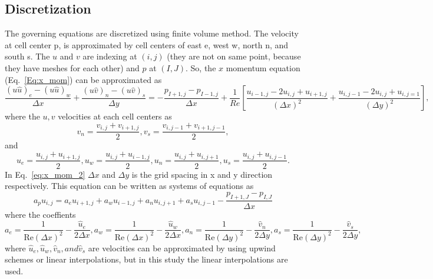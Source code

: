 \documentclass{article}
\numberwithin{equation}{section}
\numberwithin{figure}{section}
\begin{document}
\subsection{Discretization}
The governing equations are discretized using finite volume method. The velocity at cell center p, is approximated 
by cell centers of east e, west w, north n, and south s. The $u$ and $v$  are indexing at $(i,j)$ (they are not on same point, because they have meshes for each other) and $p$  at $(I,J)$. So, the $x$ momentum 
equation (Eq.~\ref{Eq:x_mom}) can be approximated as
\begin{equation}
    \label{eq:x_mom_2}
    \frac{(u \hat{u})_e -(u \hat{u})_w}{\Delta x}+\frac{(u \hat{v})_n -(u \hat{v})_s}{\Delta y}
    = -\frac{p_{I+1,j}-p_{I-1,j}}{\Delta x}  +  \frac{1}{Re} \left [\frac{u_{i-1,j}-2u_{i,j}+u_{i+1,j}}{(\Delta x)^2} + \frac{u_{i,j-1}-2u_{i,j}+u_{i,j=1}}{(\Delta y)^2}\right ],
\end{equation}
where the $u, v$ velocities at each cell centers as
\begin{equation}
    v_n = \frac{v_{i,j}+v_{i+1,j}}{2}, v_s = \frac{v_{i,j-1}+v_{i+1,j-1}}{2},
    \label{eq:x_u_v1}
\end{equation}
and
\begin{equation}
    u_e = \frac{u_{i,j}+u_{i+1,j}}{2}, u_w = \frac{u_{i,j}+u_{i-1,j}}{2}, u_n = \frac{u_{i,j}+u_{i,j+1}}{2}, u_s = \frac{u_{i,j}+u_{i,j-1}}{2}.
    \label{eq:x_u_v2}
\end{equation}
In Eq.~\ref{eq:x_mom_2} $\Delta x$ and $\Delta y$ is the grid spacing in x and y direction respectively. This equation can be written as systems of equations as
\begin{equation}
    a_p u_{i,j} = a_e u_{i+1,j} + a_w u_{i-1,j} +a_n u_{i,j+1} +a_s u_{i,j-1} - \frac{p_{I+1,J}-p_{I,J}}{\Delta x}
    \label{eq:x_u_v3}
\end{equation}
where the coeffients
\begin{equation}
    a_e = \frac{1}{\text{Re} (\Delta x)^2} - \frac{\hat{u}_e}{2 \Delta x}, a_w = \frac{1}{\text{Re} (\Delta x)^2} - \frac{\hat{u}_w}{2 \Delta x}, a_n = \frac{1}{\text{Re} (\Delta y)^2} - \frac{\hat{v}_n}{2 \Delta y}, a_s = \frac{1}{\text{Re} (\Delta y)^2} - \frac{\hat{v}_s}{2 \Delta y},
    \label{eq:coeff_x}
\end{equation}
where $\hat{u}_e,\hat{u}_w, \hat{v}_n, and \hat{v}_s$ are velocities can be approximated by using upwind schemes or linear interpolations, but in this study the linear interpolations are used. 
\end{document}
